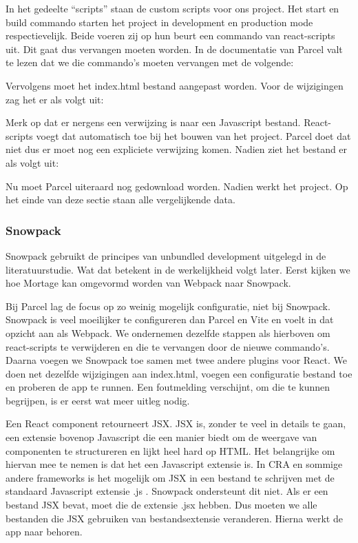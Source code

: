 In het gedeelte “scripts” staan de custom scripts voor ons project. Het start en build commando starten het project in development en production mode respectievelijk. Beide voeren zij op hun beurt een commando van react-scripts uit. Dit gaat dus vervangen moeten worden. In de documentatie van Parcel valt te lezen dat we die commando’s moeten vervangen met de volgende:

Vervolgens moet het index.html bestand aangepast worden. Voor de wijzigingen zag het er als volgt uit:

Merk op dat er nergens een verwijzing is naar een Javascript bestand. React-scripts voegt dat automatisch toe bij het bouwen van het project. Parcel doet dat niet dus er moet nog een expliciete verwijzing komen. Nadien ziet het bestand er als volgt uit:

Nu moet Parcel uiteraard nog gedownload worden. Nadien werkt het project. Op het einde van deze sectie staan alle vergelijkende data.

\subsubsection{Snowpack}
Snowpack gebruikt de principes van unbundled development uitgelegd in de literatuurstudie. Wat dat betekent in de werkelijkheid volgt later. Eerst kijken we hoe Mortage kan omgevormd worden van Webpack naar Snowpack. 

Bij Parcel lag de focus op zo weinig mogelijk configuratie, niet bij Snowpack. Snowpack is veel moeilijker te configureren dan Parcel en Vite en voelt in dat opzicht aan als Webpack. We ondernemen dezelfde stappen als hierboven om react-scripts te verwijderen en die te vervangen door de nieuwe commando’s. Daarna voegen we Snowpack toe samen met twee andere plugins voor React. We doen net dezelfde wijzigingen aan index.html, voegen een configuratie bestand toe en proberen de app te runnen. Een foutmelding verschijnt, om die te kunnen begrijpen, is er eerst wat meer uitleg nodig.

Een React component retourneert JSX. JSX is, zonder te veel in details te gaan, een extensie bovenop Javascript die een manier biedt om de weergave van componenten te structureren en lijkt heel hard op HTML. Het belangrijke om hiervan mee te nemen is dat het een Javascript extensie is. In CRA en sommige andere frameworks is het mogelijk om JSX in een bestand te schrijven met de standaard Javascript extensie .js . Snowpack ondersteunt dit niet. Als er een bestand JSX bevat, moet die de extensie .jsx hebben. Dus moeten we alle bestanden die JSX gebruiken van bestandsextensie veranderen. Hierna werkt de app naar behoren. 

